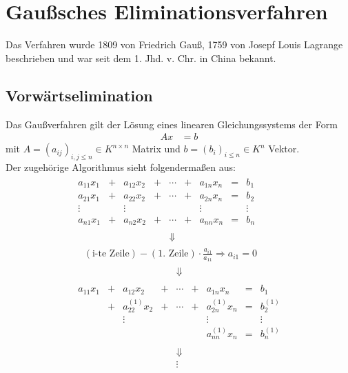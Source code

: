 \documentclass[ngerman,fontsize=11pt, paper=a4, parskip=half, titlepage=true, toc=bib]{scrbook}
\newcommand{\sectione}[1]{\section{#1} \setcounter{equation}{0}}
\begin{document}
\sectione{Gaußsches Eliminationsverfahren} \label{2.2.1} 
Das Verfahren wurde 1809 von Friedrich Gauß, 1759 von Josepf Louis Lagrange beschrieben und war seit dem 1. Jhd. v. Chr. in China bekannt.

\subsection{Vorwärtselimination} \label{2.1.1}
Das Gaußverfahren gilt der Lösung eines linearen Gleichungssystems der Form
\begin{align*}
	Ax &= b
\end{align*}
mit $A=(a_{ij})_{i,j \leq n} \in K^{n\times n}$ Matrix und $b=(b_i)_{i\leq n} \in K^n$ Vektor.\\
Der zugehörige Algorithmus sieht folgendermaßen aus:
\begin{gather*}
	\begin{array}{ccccccccc}
	a_{11}x_1 &+& a_{12}x_2 &+& \cdots &+& a_{1n}x_n & = & b_1 ~~\\
	a_{21}x_1 &+& a_{22}x_2 &+& \cdots &+& a_{2n}x_n & = & b_2 \\
	\vdots         &&        \vdots     &&              &&   \vdots       &    & \vdots \\
	a_{n1}x_1 &+& a_{n2}x_2 &+& \cdots &+& a_{nn}x_n & = & b_n \\\\
	&&&& \Downarrow &&&& 
	\end{array} \\
\quad 	(\text{i-te Zeile}) - (\text{1. Zeile})\cdot \frac{a_{i1}}{a_{11}} \Rightarrow a_{i1}=0\\
\begin{array}{ccccccccc}
&&&& \Downarrow &&&&  \\\\
a_{11}x_1 &+& a_{12}x_2 &+& \cdots &+& a_{1n}x_n & = & b_1 \\
				  &+& a_{22}^{(1)}x_2 &+& \cdots &+& a_{2n}^{(1)}x_n & = & b_2^{(1)} \\
				 &&        \vdots     &&              &&   \vdots       &    & \vdots \\
														&& && && a_{nn}^{(1)}x_n & = & b_n^{(1)} \\\\
&&&& \Downarrow &&&&\\
&&&& \vdots &&&&
\end{array} 
\end{gather*}
\end{document}
